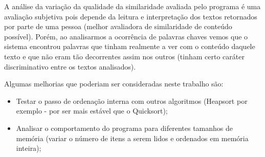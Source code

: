 \documentclass[12pt]{article}
\begin{document}
A análise da variação da qualidade da similaridade avaliada pelo programa é uma avaliação 
subjetiva pois depende da leitura e interpretação dos textos retornados por parte de uma
pessoa (melhor avaliadora de similaridade de conteúdo possível). Porém, ao analisarmos a 
ocorrência de palavras chaves vemos que o sistema encontrou palavras que tinham realmente 
a ver com o conteúdo daquele texto e que não eram tão decorrentes assim nos outros (tinham 
certo caráter discriminativo entre os textos analisados).

Algumas melhorias que poderiam ser consideradas neste trabalho são:
\begin{itemize}
\item Testar o passo de ordenação interna com outros algoritmos (Heapsort por exemplo - por
ser mais estável que o Quicksort);
\item Analisar o comportamento do programa para diferentes tamanhos de memória (variar o 
número de itens a serem lidos e ordenados em memória inteira);
\end{itemize}
\end{document}
